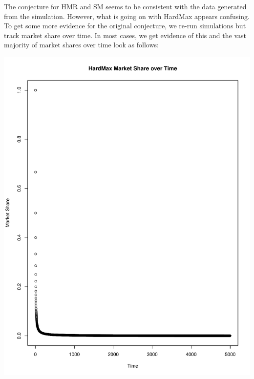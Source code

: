 \documentclass[11pt,letterpaper]{article}
\begin{document}




The conjecture for HMR and SM seems to be consistent with the data generated from the simulation. However, what is going on with HardMax appears confusing. To get some more evidence for the original conjecture, we re-run simulations but track market share over time. In most cases, we get evidence of this and the vast majority of market shares over time look as follows:

\includegraphics[scale=0.30]{decreasing_ms_over_time} \\
\end{document}
